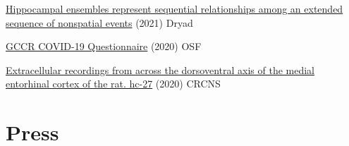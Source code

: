 \documentclass[10pt]{cooperCV2}
\begin{document}
 
\begin{etaremune}[itemindent=-1.5\bibhang, topsep=0pt,
                   itemsep=\bibsep,partopsep=0pt,parsep=0pt,leftmargin={\bibhang+\widthof{[999]}}] 
    
    \item \href{https://doi.org/10.7280/D14X30}{Hippocampal ensembles represent sequential relationships among an extended sequence of nonspatial events} (2021) Dryad
    
    \item \href{https://osf.io/a3vkw/}{GCCR COVID-19 Questionnaire} (2020) OSF
    
    \item \href{https://crcns.org/data-sets/hc/hc-27/about-hc-27}{Extracellular recordings from across the dorsoventral axis of the medial entorhinal cortex of the rat. hc-27} (2020) CRCNS
    

\end{etaremune}








%	






\section{Press}
\end{document}
